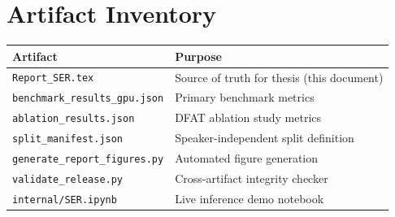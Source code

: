 \documentclass[12pt,a4paper]{report}
\begin{document}
\section{Artifact Inventory}
\begin{tabular}{ll}
\toprule
\textbf{Artifact} & \textbf{Purpose} \\
\midrule
\texttt{Report\_SER.tex} & Source of truth for thesis (this document) \\
\texttt{benchmark\_results\_gpu.json} & Primary benchmark metrics \\
\texttt{ablation\_results.json} & DFAT ablation study metrics \\
\texttt{split\_manifest.json} & Speaker-independent split definition \\
\texttt{generate\_report\_figures.py} & Automated figure generation \\
\texttt{validate\_release.py} & Cross-artifact integrity checker \\
\texttt{internal/SER.ipynb} & Live inference demo notebook \\
\bottomrule
\end{tabular}



\end{document}
